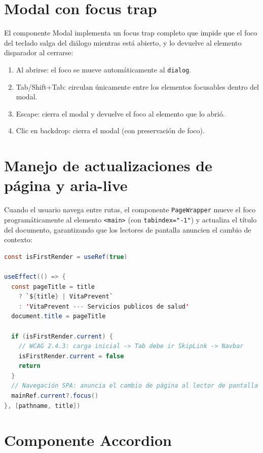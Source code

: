 \documentclass[12pt, a4paper]{report}
\begin{document}
\section{Modal con focus trap}

El componente Modal implementa un focus trap completo que impide que el foco del teclado salga del diálogo mientras está abierto, y lo devuelve al elemento disparador al cerrarse:

\begin{enumerate}
  \item Al abrirse: el foco se mueve automáticamente al \texttt{dialog}.
  \item Tab/Shift+Tab: circulan únicamente entre los elementos focusables dentro del modal.
  \item Escape: cierra el modal y devuelve el foco al elemento que lo abrió.
  \item Clic en backdrop: cierra el modal (con preservación de foco).
\end{enumerate}

\section{Manejo de actualizaciones de página y aria-live}

Cuando el usuario navega entre rutas, el componente \texttt{PageWrapper} mueve el foco programáticamente al elemento \texttt{<main>} (con \texttt{tabindex="-1"}) y actualiza el título del documento, garantizando que los lectores de pantalla anuncien el cambio de contexto:

\begin{lstlisting}[language=Java, caption={PageWrapper --- gestión de foco WCAG 2.4.3: no robar foco en carga inicial}, label={lst:pagewrapper}]
const isFirstRender = useRef(true)

useEffect(() => {
  const pageTitle = title
    ? `${title} | VitaPrevent`
    : 'VitaPrevent --- Servicios publicos de salud'
  document.title = pageTitle

  if (isFirstRender.current) {
    // WCAG 2.4.3: carga inicial -> Tab debe ir SkipLink -> Navbar
    isFirstRender.current = false
    return
  }
  // Navegación SPA: anuncia el cambio de página al lector de pantalla
  mainRef.current?.focus()
}, [pathname, title])
\end{lstlisting}

\section{Componente Accordion}
\end{document}
